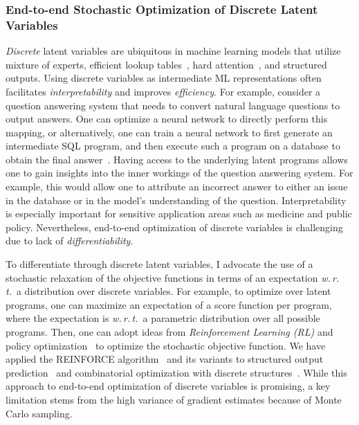 \documentclass[a4paper, 10pt]{article}
\begin{document}
{\vspace*{-.2cm}
\subsubsection*{End-to-end Stochastic Optimization of Discrete Latent Variables}
\vspace*{-.1cm}

\hspace{\parindent} {\em Discrete} latent variables are ubiquitous in
machine learning models that utilize mixture of experts, efficient
lookup tables~\cite{mih}, hard attention~\cite{hardattention}, and
structured outputs. Using discrete variables as intermediate ML
representations often facilitates {\em interpretability} and improves
{\em efficiency}. For example, consider a question answering system
that needs to convert natural language questions to output
answers. One can optimize a neural network to directly perform this
mapping, or alternatively, one can train a neural network to first
generate an intermediate SQL program, and then execute such a program
on a database to obtain the final answer~\cite{mapo}. Having access to
the underlying latent programs allows one to gain insights into the
inner workings of the question answering system. For example, this
would allow one to attribute an incorrect answer to either an issue in the
database or in the model's understanding of the
question. Interpretability is especially important for sensitive
application areas such as medicine and public policy. Nevertheless,
end-to-end optimization of discrete variables is challenging due to
lack of {\em differentiability}.

To differentiate through discrete latent variables, I advocate the use
of a stochastic relaxation of the objective functions in terms of an
expectation {\em w.\,r.\,t.}~a distribution over discrete
variables. For example, to optimize over latent programs, one can
maximize an expectation of a score function per program, where the
expectation is {\em w.\,r.\,t.}~a parametric distribution over all
possible programs.  Then, one can adopt ideas from {\em Reinforcement
Learning (RL)} and policy optimization~\cite{sutton1998reinforcement}
to optimize the stochastic objective function. We have applied the
REINFORCE algorithm~\cite{reinforce} and its variants to structured
output prediction~\cite{wu2016gnmt} and combinatorial optimization
with discrete structures~\cite{bello2016neural,azalia2017}. While this
approach to end-to-end optimization of discrete variables is
promising, a key limitation stems from the high variance of gradient
estimates because of Monte Carlo sampling.

}
\end{document}
